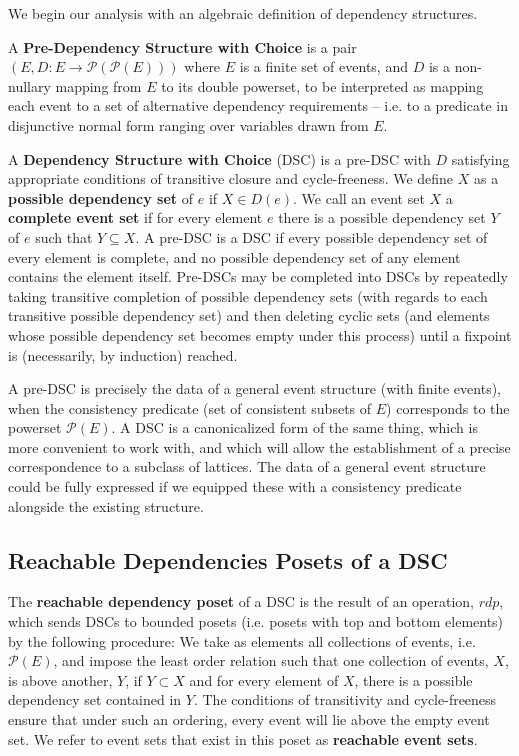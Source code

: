 \documentclass[a4paper,USenglish,cleveref, autoref, thm-restate,authorcolumns]{lipics-v2019}
\newcommand{\Pc}{\mathcal{P}}
\begin{document}
We begin our analysis with an algebraic definition of dependency structures.

\begin{definition}
A \textbf{Pre-Dependency Structure with Choice} is a pair \((E, D : E \rightarrow \Pc(\Pc(E)))\) where \(E\) is a finite set of events, and \(D\) is a non-nullary mapping from \(E\) to its double powerset, to be interpreted as mapping each event to a set of alternative dependency requirements -- i.e. to a predicate in disjunctive normal form ranging over variables drawn from \(E\).
\end{definition}

\begin{definition}
A \textbf{Dependency Structure with Choice} (DSC) is a pre-DSC with \(D\) satisfying  appropriate conditions of transitive closure and cycle-freeness. We define \(X\) as a \textbf{possible dependency set} of \(e\) if \(X \in D(e)\). We call an event set \(X\) a \textbf{complete event set} if for every element \(e\) there is a possible dependency set \(Y\) of \(e\) such that \(Y \subseteq X\). A pre-DSC is a DSC if every possible dependency set of every element is complete, and no possible dependency set of any element contains the element itself. Pre-DSCs may be completed into DSCs by repeatedly taking transitive completion of possible dependency sets (with regards to each transitive possible dependency set) and then deleting cyclic sets (and elements whose possible dependency set becomes empty under this process) until a fixpoint is (necessarily, by induction) reached.
\end{definition}

A pre-DSC is precisely the data of a general event structure (with finite events), when the consistency predicate (set of consistent subsets of \(E\)) corresponds to the powerset \(\Pc(E)\). A DSC is a canonicalized form of the same thing, which is more convenient to work with, and which will allow the establishment of a precise correspondence to a subclass of lattices. The data of a general event structure could be fully expressed if we equipped these with a consistency predicate alongside the existing structure.

\subsection{Reachable Dependencies Posets of a DSC}

\begin{definition} The \textbf{reachable dependency poset} of a DSC is the result of an operation, \(rdp\), which sends DSCs to bounded posets (i.e. posets with top and bottom elements) by the following procedure:  We take as elements all collections of events, i.e. \(\Pc(E)\), and impose the least order relation such that one collection of events, \(X\), is above another, \(Y\), if \(Y \subset X\) and for every element of \(X\), there is a possible dependency set contained in \(Y\).  The conditions of transitivity and cycle-freeness ensure that under such an ordering, every event will lie above the empty event set. We refer to event sets that exist in this poset as \textbf{reachable event sets}.
\end{definition}
\end{document}
